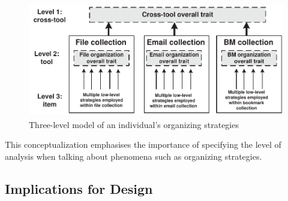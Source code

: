 \begin{figure}[hbtp]
	\begin{center}
		\leavevmode
		\includegraphics[height=5cm]{pictures/exp-study/PIM-cross-tool-strategies.pdf}
	\end{center}
	\caption{Three-level model of an individual's organizing strategies}
	\label{fig:discussion:PIM-cross-tool-strategies}
\end{figure}

This conceptualization emphasises the importance of specifying the level of analysis when talking about phenomena such as organizing strategies.





\subsection{Implications for Design}
\label{exp-study:discussion:integration}

